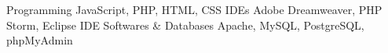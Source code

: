 \begin{cvskills}
  \cvskill
    {Programming}
    {JavaScript, PHP, HTML, CSS}
  \cvskill
  {IDEs}
  {Adobe Dreamweaver, PHP Storm, Eclipse IDE}  
  \cvskill
  {Softwares \& Databases}
  {Apache, MySQL, PostgreSQL, phpMyAdmin}      
    
\end{cvskills}
